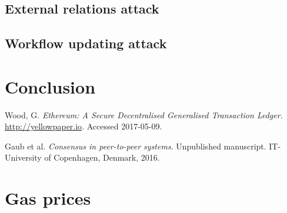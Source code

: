 \documentclass{article}
\begin{document}
		\subsection{External relations attack}

		\subsection{Workflow updating attack}

	\section{Conclusion}

	\pagebreak
	\begin{thebibliography}{99}
	
		Wood, G.
		\textit{Ethereum: A Secure Decentralised Generalised Transaction Ledger}. 
		\url{http://yellowpaper.io}.
		Accessed 2017-05-09.

		Gaub et al.
		\textit{Consensus in peer-to-peer systems}.
		Unpublished manuscript.
		IT-University of Copenhagen,
		Denmark,
		2016.


	\end{thebibliography}

	\appendix

	\clearpage

	\section{Gas prices}
		\label{app:gas-prices}
\end{document}

